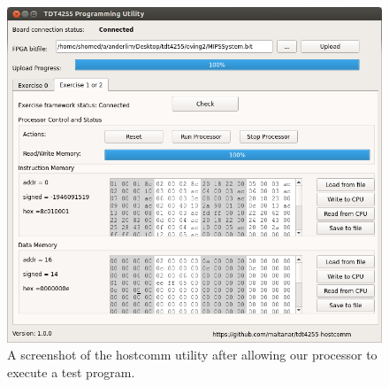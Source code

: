 \begin{figure}[h!]
    \includegraphics[width=\linewidth]{img/hostcomm_result.png}
    \caption{A screenshot of the hostcomm utility after allowing our processor to execute a test program.}
    \label{fig:hostcomm}
\end{figure}

